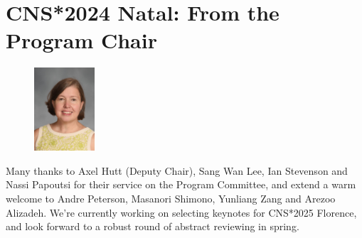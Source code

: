 \documentclass[11pt,a4paper,oneside]{article}
\begin{document}
\section*{CNS*2024 Natal: From the Program Chair}%
\begin{figure}
  \includegraphics[width=0.2\textwidth]{images/Haas}
\end{figure}

Many thanks to Axel Hutt (Deputy Chair), Sang Wan Lee, Ian Stevenson and Nassi Papoutsi for their service on the Program Committee, and extend a warm welcome to Andre Peterson, Masanori Shimono, Yunliang Zang and Arezoo Alizadeh.
We're currently working on selecting keynotes for CNS*2025 Florence, and look forward to a robust round of abstract reviewing in spring.

\clearpage
\end{document}
